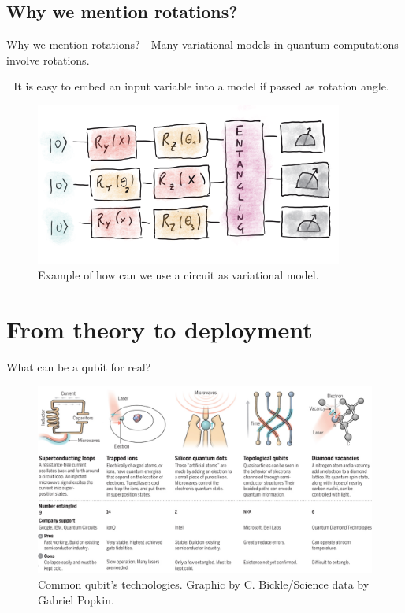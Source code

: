\documentclass[8pt, xcolor={svgnames}, hyperref={colorlinks,linkcolor=black, citecolor=amethyst, urlcolor=amethyst}]{beamer}
\begin{document}
\subsection{Why we mention rotations?}

\begin{frame}{Why we mention rotations?}
\large 
    \faArrowCircleRight\,\, Many variational models in quantum computations involve 
    rotations.
    
    \faArrowCircleRight\,\, It is easy to embed an input variable into a model if 
    passed as rotation angle.

    \begin{figure}
    \centering 
    \includegraphics[width=0.9\textwidth]{figures/variational_model.png}
  \caption{Example of how can we use a circuit as variational model.}
  \end{figure}
\end{frame}

\section{From theory to deployment}

\begin{frame}{What can be a qubit for real?}
    \begin{figure}
    \centering 
    \includegraphics[width=\textwidth]{figures/Quantum_tech.png}
  \caption{Common qubit's technologies. Graphic by C. Bickle/Science data by Gabriel Popkin.}
  \end{figure}
\end{frame}
\end{document}
